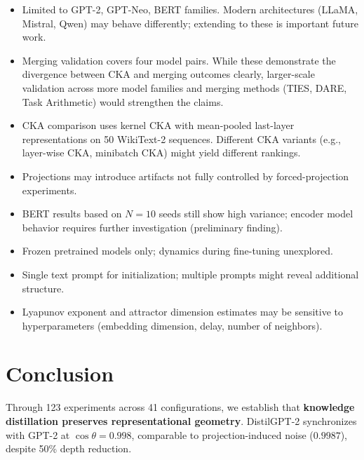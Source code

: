 \documentclass[10pt]{article} %
\theoremstyle{plain}
\theoremstyle{definition}
\theoremstyle{remark}
\begin{document}
\begin{itemize}
    \item Limited to GPT-2, GPT-Neo, BERT families. Modern architectures (LLaMA, Mistral, Qwen) may behave differently; extending to these is important future work.
    \item Merging validation covers four model pairs. While these demonstrate the divergence between CKA and merging outcomes clearly, larger-scale validation across more model families and merging methods (TIES, DARE, Task Arithmetic) would strengthen the claims.
    \item CKA comparison uses kernel CKA with mean-pooled last-layer representations on 50 WikiText-2 sequences. Different CKA variants (e.g., layer-wise CKA, minibatch CKA) might yield different rankings.
    \item Projections may introduce artifacts not fully controlled by forced-projection experiments.
    \item BERT results based on $N=10$ seeds still show high variance; encoder model behavior requires further investigation (preliminary finding).
    \item Frozen pretrained models only; dynamics during fine-tuning unexplored.
    \item Single text prompt for initialization; multiple prompts might reveal additional structure.
    \item Lyapunov exponent and attractor dimension estimates may be sensitive to hyperparameters (embedding dimension, delay, number of neighbors).
\end{itemize}

\section{Conclusion}

Through 123 experiments across 41 configurations, we establish that \textbf{knowledge distillation preserves representational geometry}. DistilGPT-2 synchronizes with GPT-2 at $\cos \theta = 0.998$, comparable to projection-induced noise ($0.9987$), despite 50\% depth reduction.
\end{document}
